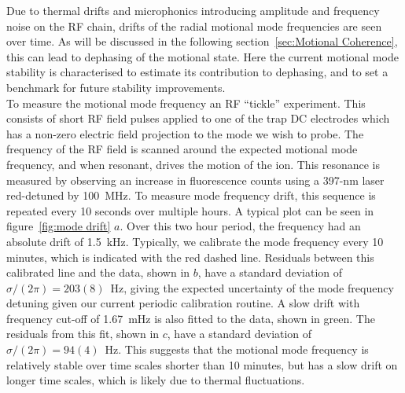     Due to thermal drifts and microphonics introducing amplitude and frequency noise on the RF chain, drifts of the radial motional mode frequencies are seen over time. As will be discussed in the following section~\ref{sec:Motional Coherence}, this can lead to dephasing of the motional state. Here the current motional mode stability is characterised to estimate its contribution to dephasing, and to set a benchmark for future stability improvements. \\
    To measure the motional mode frequency an RF ``tickle'' experiment. This consists of short RF field pulses applied to one of the trap DC electrodes which has a non-zero electric field projection to the mode we wish to probe. The frequency of the RF field is scanned around the expected motional mode frequency, and when resonant, drives the motion of the ion. This resonance is measured by observing an increase in fluorescence counts using a 397-nm laser red-detuned by 100~\unit{\MHz}. To measure mode frequency drift, this sequence is repeated every 10 seconds over multiple hours. A typical plot can be seen in figure~\ref{fig:mode drift} $a$. Over this two hour period, the frequency had an absolute drift of 1.5~\unit{\kHz}. Typically, we calibrate the mode frequency every 10 minutes, which is indicated with the red dashed line. Residuals between this calibrated line and the data, shown in $b$, have a standard deviation of $\sigma/(2\pi) = 203(8)$~\unit{\Hz}, giving the expected uncertainty of the mode frequency detuning given our current periodic calibration routine. A slow drift with frequency cut-off of 1.67~\unit{\mHz} is also fitted to the data, shown in green. The residuals from this fit, shown in $c$, have a standard deviation of $\sigma/(2\pi) = 94(4)$~\unit{\Hz}. This suggests that the motional mode frequency is relatively stable over time scales shorter than 10 minutes, but has a slow drift on longer time scales, which is likely due to thermal fluctuations. \\
    
    

